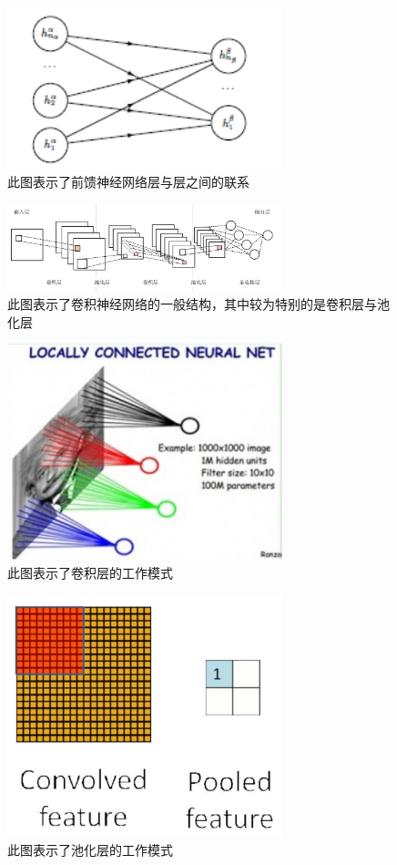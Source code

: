 \documentclass[aps,pre,12pt,preprint,onecolumn,showpacs,showkeys]{revtex4-1}
\begin{document}
\begin{figure}[htbp]
\centering
\includegraphics[width=80mm]{cjlj}
\caption{\label{fig:cjlj}%
此图表示了前馈神经网络层与层之间的联系}
\end{figure}
\begin{figure}[htbp]
\centering
\includegraphics[width=80mm]{cnnn}
\caption{\label{fig:cnnn}%
此图表示了卷积神经网络的一般结构，其中较为特别的是卷积层与池化层}
\end{figure}
\begin{figure}[htbp]
\centering
\includegraphics[width=80mm]{cnv}
\caption{\label{fig:cnv}%
此图表示了卷积层的工作模式}
\end{figure}
\begin{figure}[htbp]
\centering
\includegraphics[width=80mm]{pool}
\caption{\label{fig:pool}%
此图表示了池化层的工作模式}
\end{figure}
\end{document}
